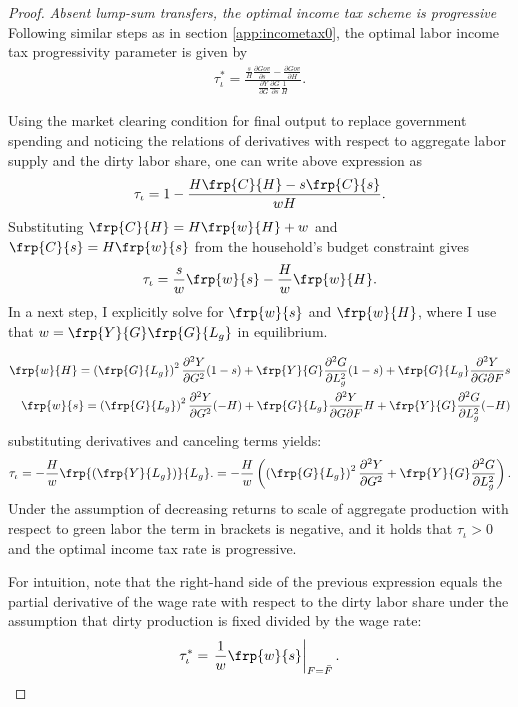 \begin{proof}\textit{Absent lump-sum transfers, the optimal income tax scheme is progressive}
Following similar steps as in section \ref{app:incometax0}, the optimal labor income tax progressivity parameter is given by
\begin{align}
\tau_{\iota}^*=\frac{\frac{s}{H}\frac{\partial Gov}{\partial s}- \frac{\partial Gov}{\partial H}}{\frac{\partial Y}{\partial G}\frac{\partial G}{\partial s}\frac{1}{H}}.
\end{align}

	Using the market clearing condition for final output to replace government spending and noticing the relations of derivatives with respect to aggregate labor supply and the dirty labor share, one can write above expression as
	\begin{align}
	\tau_{\iota}=1-\frac{H\frp{C}{H}-s\frp{C}{s}}{wH}.
	\end{align}
	Substituting $\frp{C}{H}=H\frp{w}{H}+w$ and $\frp{C}{s}=H\frp{w}{s}$ from the household's budget constraint gives
	\begin{align}
	\tau_{\iota}=\frac{s}{w}\frp{w}{s}-\frac{H}{w}\frp{w}{H}.
	\end{align}
In a next step, I explicitly solve for $\frp{w}{s}$ and $\frp{w}{H}$, where I use that $w=\frp{Y}{G}\frp{G}{L_g}$ in equilibrium.

\begin{align}
\frp{w}{H}=\left(\frp{G}{L_g}\right)^2\frac{\partial^2Y}{\partial G^2}(1-s)+\frp{Y}{G}\frac{\partial ^2G}{\partial L_g^2}(1-s)+\frp{G}{L_g}\frac{\partial^2 Y}{\partial G \partial F}s\\
\frp{w}{s}= \left(\frp{G}{L_g}\right)^2\frac{\partial ^2Y}{\partial G^2}(-H)+\frp{G}{L_g}\frac{\partial ^2Y}{\partial G \partial F}H+\frp{Y}{G}\frac{\partial ^2 G}{\partial L_g^2}(-H)
\end{align}
substituting derivatives and canceling terms yields:
\begin{align}
\tau_\iota= -\frac{H}{w}\frp{\left(\frp{Y}{L_g}\right)}{L_g}.=-\frac{H}{w}\left(\left(\frp{G}{L_g}\right)^2\frac{\partial ^2Y}{\partial G^2}+\frp{Y}{G}\frac{\partial ^2G}{\partial L_g ^2}\right).
\end{align}
Under the assumption of decreasing returns to scale of aggregate production with respect to green labor the term in brackets is negative, and it holds that $\tau_\iota >0$ and the optimal income tax rate is progressive. 

For intuition, note that the right-hand side of the previous expression equals the partial derivative of the wage rate with respect to the dirty labor share under the assumption that dirty production is fixed divided by the wage rate:
\begin{align}
\tau^*_\iota =\left. \frac{1}{w}\frp{w}{s} \right|_{F=\bar{F}}.
\end{align}


\end{proof}

